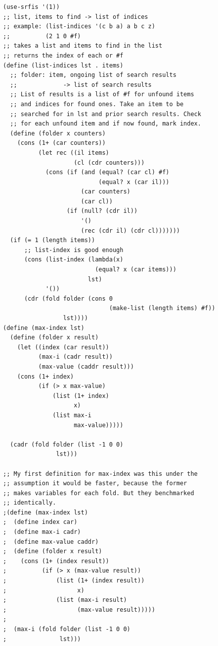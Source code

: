 \documentclass[final,fleqn,titlepage,twoside]{article}
\begin{document}
\begin{verbatim}
(use-srfis '(1))
;; list, items to find -> list of indices
;; example: (list-indices '(c b a) a b c z)
;;          (2 1 0 #f)
;; takes a list and items to find in the list
;; returns the index of each or #f
(define (list-indices lst . items)
  ;; folder: item, ongoing list of search results
  ;;             -> list of search results
  ;; List of results is a list of #f for unfound items
  ;; and indices for found ones. Take an item to be
  ;; searched for in lst and prior search results. Check
  ;; for each unfound item and if now found, mark index.
  (define (folder x counters)
    (cons (1+ (car counters))
          (let rec ((il items)
                    (cl (cdr counters)))
            (cons (if (and (equal? (car cl) #f)
                           (equal? x (car il)))
                      (car counters)
                      (car cl))
                  (if (null? (cdr il))
                      '()
                      (rec (cdr il) (cdr cl)))))))
  (if (= 1 (length items))
      ;; list-index is good enough
      (cons (list-index (lambda(x)
                          (equal? x (car items)))
                        lst)
            '())
      (cdr (fold folder (cons 0
                              (make-list (length items) #f))    
                 lst))))
(define (max-index lst)
  (define (folder x result)
    (let ((index (car result))
          (max-i (cadr result))
          (max-value (caddr result)))
    (cons (1+ index)
          (if (> x max-value)
              (list (1+ index)
                    x)
              (list max-i
                    max-value)))))

  (cadr (fold folder (list -1 0 0)
               lst)))

;; My first definition for max-index was this under the
;; assumption it would be faster, because the former
;; makes variables for each fold. But they benchmarked
;; identically.
;(define (max-index lst)
;  (define index car)
;  (define max-i cadr)
;  (define max-value caddr)
;  (define (folder x result)
;    (cons (1+ (index result))
;          (if (> x (max-value result))
;              (list (1+ (index result))
;                    x)
;              (list (max-i result)
;                    (max-value result)))))
;
;  (max-i (fold folder (list -1 0 0)
;               lst)))
\end{verbatim}
\end{document}
